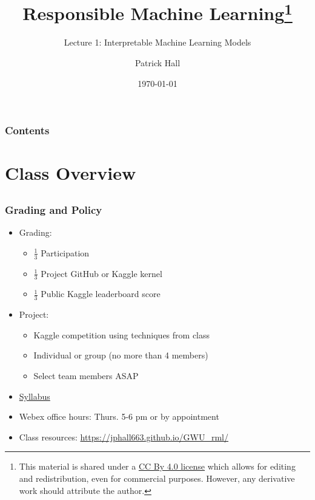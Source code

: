 \documentclass[11pt,aspectratio=169,hyperref={colorlinks}]{beamer}
\author{Patrick Hall}
\title{Responsible Machine Learning\footnote{\tiny{This material is shared under a \href{https://creativecommons.org/licenses/by/4.0/deed.ast}{CC By 4.0 license} which allows for editing and redistribution, even for commercial purposes. However, any derivative work should attribute the author.}}}
\subtitle{Lecture 1: Interpretable Machine Learning Models}
\institute{The George Washington University}
\date{\today}
\begin{document}
	
	\maketitle
	
	\begin{frame}
	
		\frametitle{Contents}
		
		\tableofcontents{}
		
	\end{frame}
	

	\section{Class Overview}
	\subsection*{}
	
	\begin{frame}
	
		\frametitle{Grading and Policy}
			
		\begin{itemize}
			\item{Grading:}
				\begin{itemize}
					\item{$\frac{1}{3}$ Participation}
					\item{$\frac{1}{3}$ Project GitHub or Kaggle kernel}
                    \item{$\frac{1}{3}$ Public Kaggle leaderboard score}
				\end{itemize}
			\item{Project:}	
				\begin{itemize}
					\item{Kaggle competition using techniques from class}
					\item{Individual or group (no more than 4 members)}
					\item Select team members ASAP
				\end{itemize}
			\item \href{}{Syllabus}
			\item{Webex office hours: Thurs. 5-6 pm or by appointment}
			\item{Class resources: \url{https://jphall663.github.io/GWU_rml/}}	
		\end{itemize}		
			
	\end{frame}
	
\end{document}
